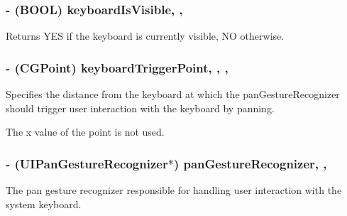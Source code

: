 \subsubsection[{keyboard\+Is\+Visible}]{\setlength{\rightskip}{0pt plus 5cm}-\/ (B\+O\+O\+L) keyboard\+Is\+Visible\hspace{0.3cm}{\ttfamily [read]}, {\ttfamily [nonatomic]}, {\ttfamily [assign]}}\label{interface_j_s_q_messages_keyboard_controller_abcd730af98f27ef8d6e9207200b7db74}
Returns {\ttfamily Y\+E\+S} if the keyboard is currently visible, {\ttfamily N\+O} otherwise. \hypertarget{interface_j_s_q_messages_keyboard_controller_a46912c3e769f2dd63aa2d714ad36c39c}{}
\subsubsection[{keyboard\+Trigger\+Point}]{\setlength{\rightskip}{0pt plus 5cm}-\/ (C\+G\+Point) keyboard\+Trigger\+Point\hspace{0.3cm}{\ttfamily [read]}, {\ttfamily [write]}, {\ttfamily [nonatomic]}, {\ttfamily [assign]}}\label{interface_j_s_q_messages_keyboard_controller_a46912c3e769f2dd63aa2d714ad36c39c}
Specifies the distance from the keyboard at which the {\ttfamily pan\+Gesture\+Recognizer} should trigger user interaction with the keyboard by panning.

The x value of the point is not used. \hypertarget{interface_j_s_q_messages_keyboard_controller_a017aa6ba932e9d0d3d4c521b416644a8}{}
\subsubsection[{pan\+Gesture\+Recognizer}]{\setlength{\rightskip}{0pt plus 5cm}-\/ (U\+I\+Pan\+Gesture\+Recognizer$\ast$) pan\+Gesture\+Recognizer\hspace{0.3cm}{\ttfamily [read]}, {\ttfamily [nonatomic]}, {\ttfamily [weak]}}\label{interface_j_s_q_messages_keyboard_controller_a017aa6ba932e9d0d3d4c521b416644a8}
The pan gesture recognizer responsible for handling user interaction with the system keyboard. \hypertarget{interface_j_s_q_messages_keyboard_controller_a4053b7b2aafa792d2cceba5e3ccdf56d}{}
